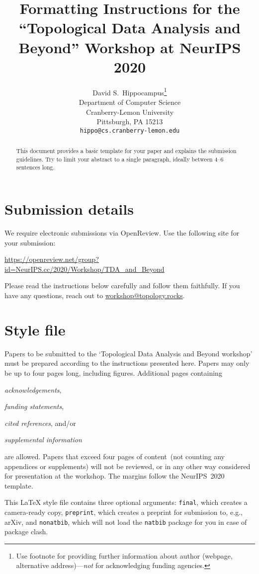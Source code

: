 \documentclass{article}
\title{
  Formatting Instructions for the ``Topological Data Analysis and Beyond''
  Workshop at NeurIPS 2020
}
\author{%
  David S.~Hippocampus\thanks{Use footnote for providing further information
    about author (webpage, alternative address)---\emph{not} for acknowledging
    funding agencies.} \\
  Department of Computer Science\\
  Cranberry-Lemon University\\
  Pittsburgh, PA 15213 \\
  \texttt{hippo@cs.cranberry-lemon.edu} \\
}
\begin{document}
\maketitle

\begin{abstract}
  This document provides a basic template for your paper and explains
  the submission guidelines. Try to limit your abstract to a single paragraph,
  ideally between 4--6 sentences long.
\end{abstract}

\section{Submission details}

We require electronic submissions via OpenReview. Use the following site
for your submission:
%
\begin{center}
  \url{https://openreview.net/group?id=NeurIPS.cc/2020/Workshop/TDA_and_Beyond}
\end{center}
%
Please read the instructions below carefully and follow them faithfully.
If you have any questions, reach out to \href{mailto:workshop@topology.rocks}{workshop@topology.rocks}.

\section{Style file}

Papers to be submitted to the `Topological Data Analysis and Beyond
workshop' must be prepared according to the instructions presented here.
Papers may only be up to four pages long, including figures.
%
Additional pages containing
%
\begin{inparaenum}[(i)]
  \item \emph{acknowledgements},
  \item \emph{funding statements},
  \item \emph{cited references}, and/or
  \item \emph{supplemental information}
\end{inparaenum}
%
are allowed.
%
Papers that exceed four pages of content~(not counting any appendices or
supplements) will not be reviewed, or in any other way considered for
presentation at the workshop. The margins follow the NeurIPS~2020
template.

This \LaTeX{} style file contains three optional arguments: \verb+final+, which
creates a camera-ready copy, \verb+preprint+, which creates a preprint for
submission to, e.g., arXiv, and \verb+nonatbib+, which will not load the
\verb+natbib+ package for you in case of package clash.
\end{document}

